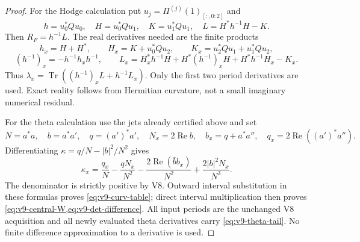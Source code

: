 \documentclass[11pt]{article}
\theoremstyle{definition}
\theoremstyle{remark}
\newcommand{\Tr}{\operatorname{Tr}}
\begin{document}
\begin{proof}
For the Hodge calculation put $u_j=\Pi^{(j)}(1)_{[:,0:2]}$ and
\[
 h=u_0^*Qu_0,\quad H=u_0^*Qu_1,\quad K=u_1^*Qu_1,\quad
 L=H^*h^{-1}H-K.
\]
Then $R_F=h^{-1}L$. The real derivatives needed are the finite products
\[
 h_x=H+H^*,\qquad H_x=K+u_0^*Qu_2,\qquad
 K_x=u_2^*Qu_1+u_1^*Qu_2,
\]
\[
 (h^{-1})_x=-h^{-1}h_xh^{-1},\qquad
 L_x=H_x^*h^{-1}H+H^*(h^{-1})_xH+H^*h^{-1}H_x-K_x.
\]
Thus $\lambda_x=\Tr((h^{-1})_xL+h^{-1}L_x)$. Only the first two
period derivatives are used. Exact reality follows from Hermitian
curvature, not a small imaginary numerical residual.

For the theta calculation use the jets already certified above and set
\[
 N=a^*a,\quad b=a^*a',\quad q=(a')^*a',\quad
 N_x=2\operatorname{Re}b,\quad b_x=q+a^*a'',\quad
 q_x=2\operatorname{Re}((a')^*a'').
\]
Differentiating $\kappa=q/N-|b|^2/N^2$ gives
\begin{equation}
 \kappa_x=\frac{q_x}{N}-\frac{qN_x}{N^2}
 -\frac{2\operatorname{Re}(\bar b b_x)}{N^2}
 +\frac{2|b|^2N_x}{N^3}.
 \label{eq:v9-kappax}
\end{equation}
The denominator is strictly positive by V8. Outward interval substitution
in these formulas proves \cref{eq:v9-curv-table}; direct interval
multiplication then proves \cref{eq:v9-central-W,eq:v9-det-difference}.
All input periods are the unchanged V8 acquisition and all newly evaluated
theta derivatives carry \cref{eq:v9-theta-tail}. No finite difference
approximation to a derivative is used.
\end{proof}
\end{document}
